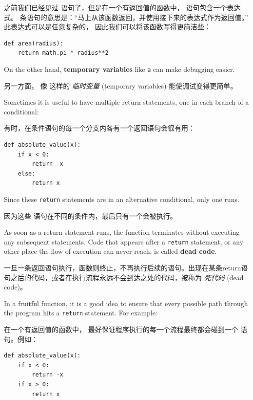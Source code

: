 之前我们已经见过  语句了，但是在一个有返回值的函数中，  语句包含一个表达式。
条语句的意思是：``马上从该函数返回，并使用接下来的表达式作为返回值。''
此表达式可以是任意复杂的， 因此我们可以将该函数写得更简洁些：
  

\begin{lstlisting}
def area(radius):
    return math.pi * radius**2
\end{lstlisting}

%
On the other hand, {\bf temporary variables} like {\tt a} can make
debugging easier.

另一方面， 像  这样的 {\em 临时变量} (temporary variables) 能使调试变得更简单。

  

Sometimes it is useful to have multiple return statements, one in each
branch of a conditional:

有时，在条件语句的每一个分支内各有一个返回语句会很有用：

\begin{lstlisting}
def absolute_value(x):
    if x < 0:
        return -x
    else:
        return x
\end{lstlisting}

%
Since these {\tt return} statements are in an alternative conditional,
only one runs.

因为这些  语句在不同的条件内，最后只有一个会被执行。

As soon as a return statement runs, the function
terminates without executing any subsequent statements.
Code that appears after a {\tt return} statement, or any other place
the flow of execution can never reach, is called {\bf dead code}.

一旦一条返回语句执行，函数则终止，不再执行后续的语句。出现在某条return语句之后的代码，或者在执行流程永远不会到达之处的代码，被称为 {\em 死代码} (dead code)。

In a fruitful function, it is a good idea to ensure
that every possible path through the program hits a
{\tt return} statement.  For example:

在一个有返回值的函数中， 最好保证程序执行的每一个流程最终都会碰到一个  语句。例如：

\begin{lstlisting}
def absolute_value(x):
    if x < 0:
        return -x
    if x > 0:
        return x
\end{lstlisting}

